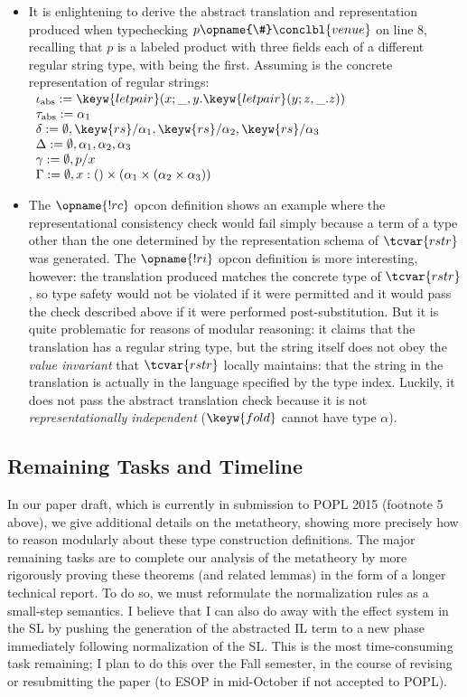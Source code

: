\begin{itemize}
\item It is enlightening to derive the abstract translation and representation produced when typechecking $p\opname{\#}\conclbl{venue}$ on line 8, recalling that $p$ is a labeled product with three fields each of a different regular string type, with  being the first. Assuming  is the concrete representation of regular strings: $\begin{array}{l}
\iota_\text{abs} := \keyw{letpair}(x; \_, y.\keyw{letpair}(y; z, \_.z))\\
\tau_\text{abs} := \alpha_1\\
\delta := \emptyset, \keyw{rs}/\alpha_1, \keyw{rs}/\alpha_2, \keyw{rs}/\alpha_3\\
\Delta := \emptyset, \alpha_1, \alpha_2, \alpha_3\\
\gamma := \emptyset, p/x\\
\Gamma := \emptyset, x : \iunit \times (\alpha_1 \times (\alpha_2 \times \alpha_3))
\end{array}$
\item The $\opname{!rc}$ opcon definition shows an example where the representational consistency check would fail simply because a term of a type other than the one determined by the representation schema of $\tcvar{rstr}$ was generated. The $\opname{!ri}$ opcon definition is more interesting, however: the translation produced matches the concrete type of $\tcvar{rstr}$, so type safety would not be violated if it were permitted and it would pass the check described above if it were performed post-substitution. But it is quite problematic for reasons of modular reasoning: it claims that the translation has a regular string type, but the string itself does not obey the \emph{value invariant} that $\tcvar{rstr}$ locally maintains: that the string in the translation is actually in the language specified by the type index. Luckily, it does not pass the abstract translation check because it is not \emph{representationally independent} ($\keyw{fold}$ cannot have type $\alpha$).
\end{itemize}

\subsection{Remaining Tasks and Timeline}
In our paper draft, which is currently in submission to POPL 2015 (footnote 5 above), we give  additional details on the metatheory, showing more precisely how to reason modularly about these type construction definitions. The major remaining tasks are to complete our analysis of the metatheory by more rigorously proving these theorems (and related lemmas) in the form of a longer technical report. To do so, we must reformulate the normalization rules as a small-step semantics. I believe that I can also do away with the effect system in the SL by pushing the generation of the abstracted IL term to a new phase immediately following normalization of the SL. This is the most time-consuming task remaining; I plan to do this over the Fall semester, in the course of revising or resubmitting the paper (to ESOP in mid-October if not accepted to POPL).

